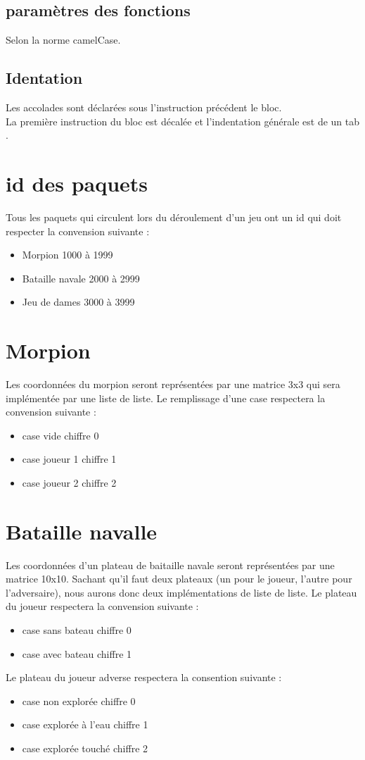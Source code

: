 \documentclass{report}
\begin{document}
\subsection{paramètres des fonctions} 
Selon la norme camelCase.
\subsection{Identation}
Les accolades sont déclarées sous l’instruction précédent le bloc.\\
La première instruction du bloc est décalée et l’indentation générale est de un \og tab \fg{}.

\section{id des paquets}
Tous les paquets qui circulent lors du déroulement d'un jeu ont un id qui doit respecter la convension suivante :
\begin{itemize}
	\item Morpion \tabto{4cm} 1000 à 1999
	\item Bataille navale \tabto{4cm} 2000 à 2999
	\item Jeu de dames \tabto{4cm} 3000 à 3999
\end{itemize}
\section{Morpion}
Les coordonnées du morpion seront représentées par une matrice 3x3 qui sera implémentée par une liste de liste.
Le remplissage d'une case respectera la convension suivante :
\begin{itemize}
	\item case vide \tabto{4cm} chiffre 0
	\item case joueur 1 \tabto{4cm} chiffre 1
	\item case joueur 2 \tabto{4cm} chiffre 2
\end{itemize}
\section{Bataille navalle}
Les coordonnées d'un plateau de baitaille navale seront représentées par une matrice 10x10. Sachant qu'il faut deux plateaux (un pour le joueur, l'autre pour l'adversaire),
nous aurons donc deux implémentations de liste de liste.
Le plateau du joueur respectera la convension suivante :
\begin{itemize}
	\item case sans bateau \tabto{4cm} chiffre 0
	\item case avec bateau \tabto{4cm} chiffre 1
\end{itemize}
Le plateau du joueur adverse respectera la consention suivante :
\begin{itemize}
	\item case non explorée \tabto{4cm} chiffre 0
	\item case explorée \og à l'eau \fg{} \tabto{4cm} chiffre 1
	\item case explorée \og touché \fg{} \tabto{4cm} chiffre 2
\end{itemize}
\end{document}

